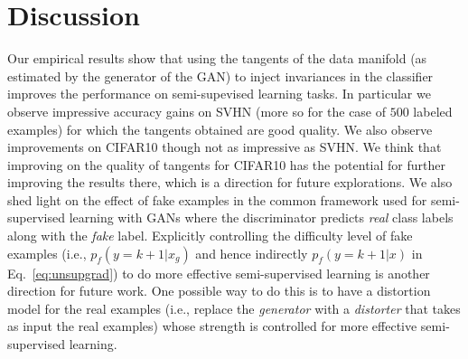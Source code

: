 \documentclass{article}
\begin{document}
\vspace{-2mm}\section{Discussion}\vspace{-2mm}
Our empirical results show that using the tangents of the data manifold (as estimated by the generator of the GAN) to inject invariances in the classifier improves the performance on semi-supevised learning tasks. In particular we observe impressive accuracy gains on SVHN (more so for the case of $500$ labeled examples) for which the tangents obtained are good quality. We also observe improvements on CIFAR10 though not as impressive as SVHN. We think that improving on the quality of tangents for CIFAR10 has the potential for further improving the results there, which is a direction for future explorations. We also shed light on the effect of fake examples in the common framework used for semi-supervised learning with GANs where the discriminator predicts \emph{real} class labels along with the \emph{fake} label. Explicitly controlling the difficulty level of fake examples (i.e., $p_f(y=k+1|x_g)$ and hence indirectly $p_f(y=k+1|x)$ in Eq.~\eqref{eq:unsupgrad}) to do more effective semi-supervised learning is another direction for future work. One possible way to do this is to have a distortion model for the real examples (i.e., replace the \emph{generator} with a \emph{distorter} that takes as input the real examples) whose strength is controlled for more effective semi-supervised learning. 
\end{document}
